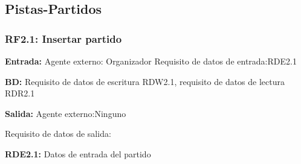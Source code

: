 \subsection{Pistas-Partidos}

\subsubsection{RF2.1: Insertar partido}
\textbf{Entrada:} Agente externo: Organizador    Requisito de datos de entrada:RDE2.1

\textbf{BD:} Requisito de datos de  escritura RDW2.1, requisito de datos de lectura RDR2.1

\textbf{Salida:} Agente externo:Ninguno

Requisito de datos de salida:

\textbf{RDE2.1:} Datos de entrada del partido
